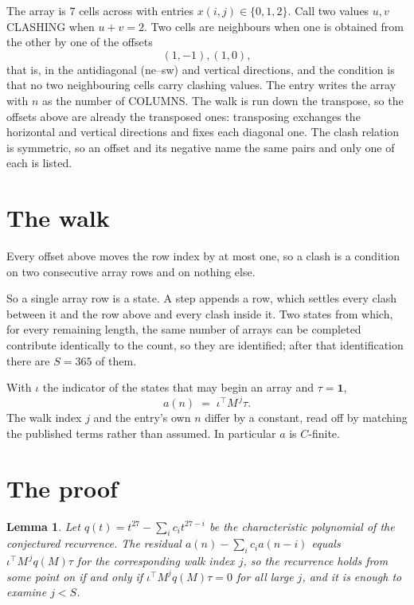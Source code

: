 \documentclass[11pt,a4paper]{article}
\theoremstyle{plain}
\newtheorem{lemma}[theorem]{Lemma}
\theoremstyle{definition}
\begin{document}
The array is $7$ cells across with entries $x(i,j)\in\{0,1,2\}$. Call two values $u,v$ CLASHING
when $u+v=2$. Two cells are neighbours when one is obtained from the other by one of
the offsets
\[
(1,-1), (1,0),
\]
that is, in the antidiagonal (ne--sw) and vertical directions, and the condition is that no two neighbouring cells carry
clashing values. The entry writes the array with $n$ as the number of COLUMNS. The walk is run down the transpose, so the offsets above are already the transposed ones: transposing exchanges the horizontal and vertical directions and fixes each diagonal one. The clash relation is symmetric, so an offset and its negative name the
same pairs and only one of each is listed.

\section{The walk}

Every offset above moves the row index by at most one, so a clash is a condition on two
consecutive array rows and on nothing else.

So a single array row is a state. A step appends a row, which settles every clash between it
and the row above and every clash inside it. Two states from which, for every remaining length,
the same number of arrays can be completed contribute identically to the count, so they are
identified; after that identification there are $S=365$ of them.

With $\iota$ the indicator of the states that may begin an array and $\tau=\mathbf{1}$,
\[
a(n)\;=\;\iota^{\!\top}M^{\,j}\tau .
\]
The walk index $j$ and the entry's own $n$ differ by a constant, read off by matching the
published terms rather than assumed. In particular $a$ is $C$-finite.

\section{The proof}

\begin{lemma}\label{lem:crit}
Let $q(t)=t^{27}-\sum_i c_it^{27-i}$ be the characteristic polynomial of the
conjectured recurrence. The residual $a(n)-\sum_ic_ia(n-i)$ equals
$\iota^{\!\top}M^{\,j}q(M)\tau$ for the corresponding walk index $j$, so the recurrence
holds from some point on if and only if $\iota^{\!\top}M^{j}q(M)\tau=0$ for all large $j$,
and it is enough to examine $j<S$.
\end{lemma}
\end{document}

